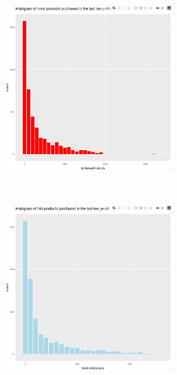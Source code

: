 \begin{frame}[fragile]
\begin{figure}
        \hfill
        \begin{minipage}{.3\textwidth}
            \begin{subfigure}{\textwidth}
            \centering
            \includegraphics[width=0.7\textwidth]{Img/eda/EDA020.png}
            \end{subfigure}\\
            \begin{subfigure}{\textwidth}
            \centering
            \includegraphics[width=0.7\textwidth]{Img/eda/EDA021.png}
            \end{subfigure}%
        \end{minipage}
        \hfill
        \begin{minipage}{.3\textwidth}
            \begin{subfigure}{\textwidth}
            \centering

\end{subfigure}
\end{minipage}
\end{figure}
\end{frame}

